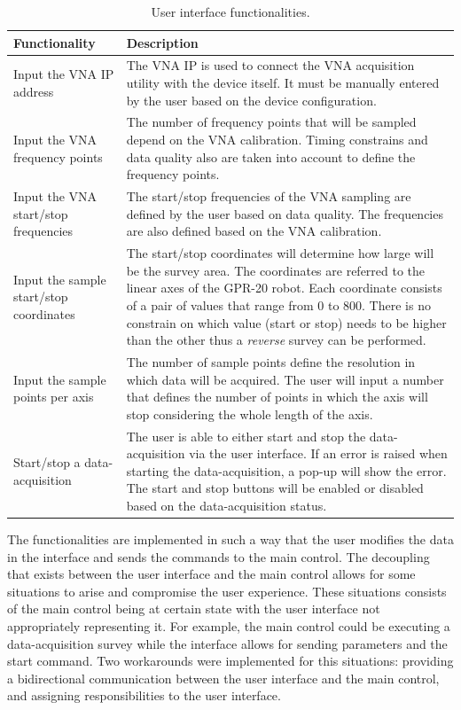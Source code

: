 \documentclass{article}
\begin{document}
\begin{table}[h]
    \centering
    \begin{tabular}{|p{5cm}|p{10cm}|}
        \hline \textbf{Functionality} & \textbf{Description} \\ \hline
        Input the VNA IP address &  The VNA IP is used to connect the VNA acquisition utility with the device itself. It must be manually entered by the user based on the device configuration. \\ \hline
        Input the VNA frequency points & The number of frequency points that will be sampled depend on the VNA calibration. Timing constrains and data quality also are taken into account to define the frequency points. \\ \hline
        Input the VNA start/stop frequencies & The start/stop frequencies of the VNA sampling are defined by the user based on data quality. The frequencies are also defined based on the VNA calibration. \\ \hline
        Input the sample start/stop coordinates & The start/stop coordinates will determine how large will be the survey area. The coordinates are referred to the linear axes of the GPR-20 robot. Each coordinate consists of a pair of values that range from 0 to 800. There is no constrain on which value (start or stop) needs to be higher than the other thus a \textit{reverse} survey can be performed. \\ \hline
        Input the sample points per axis & The number of sample points define the resolution in which data will be acquired. The user will input a number that defines the number of points in which the axis will stop considering the whole length of the axis. \\ \hline
        Start/stop a data-acquisition & The user is able to either start and stop the data-acquisition via the user interface. If an error is raised when starting the data-acquisition, a pop-up will show the error. The start and stop buttons will be enabled or disabled based on the data-acquisition status. \\ \hline
    \end{tabular}
    \caption{User interface functionalities.}
    \label{tab:user_interface}
\end{table}

The functionalities are implemented in such a way that the user modifies the data in the interface and sends the commands to the main control. The decoupling that exists between the user interface and the main control allows for some situations to arise and compromise the user experience. These situations consists of the main control being at certain state with the user interface not appropriately representing it. For example, the main control could be executing a data-acquisition survey while the interface allows for sending parameters and the start command. Two workarounds were implemented for this situations: providing a bidirectional communication between the user interface and the main control, and assigning responsibilities to the user interface.
\end{document}
